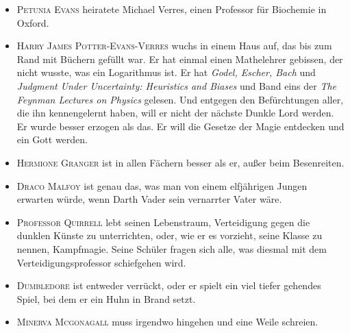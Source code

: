 \begin{itemize}
\item \textsc{Petunia Evans} heiratete Michael Verres, einen Professor für Biochemie in Oxford.
\item \textsc{Harry James Potter-Evans-Verres} wuchs in einem Haus auf, das bis zum Rand mit Büchern gefüllt war. Er hat einmal einen Mathelehrer gebissen, der nicht wusste, was ein Logarithmus ist. Er hat \emph{Godel, Escher, Bach} und \emph{Judgment Under Uncertainty: Heuristics and Biases} und Band eins der \emph{The Feynman Lectures on Physics} gelesen. Und entgegen den Befürchtungen aller, die ihn kennengelernt haben, will er nicht der nächste Dunkle Lord werden. Er wurde besser erzogen als das. Er will die Gesetze der Magie entdecken und ein Gott werden.
\item \textsc{Hermione Granger} ist in allen Fächern besser als er, außer beim Besenreiten.
\item \textsc{Draco Malfoy} ist genau das, was man von einem elfjährigen Jungen erwarten würde, wenn Darth Vader sein vernarrter Vater wäre.
\item \textsc{Professor Quirrell} lebt seinen Lebenstraum, Verteidigung gegen die dunklen Künste zu unterrichten, oder, wie er es vorzieht, seine Klasse zu nennen, Kampfmagie. Seine Schüler fragen sich alle, was diesmal mit dem Verteidigungsprofessor schiefgehen wird.
\item \textsc{Dumbledore} ist entweder verrückt, oder er spielt ein viel tiefer gehendes Spiel, bei dem er ein Huhn in Brand setzt.
\item \textsc{Minerva Mcgonagall} muss irgendwo hingehen und eine Weile schreien.
\end{itemize}

